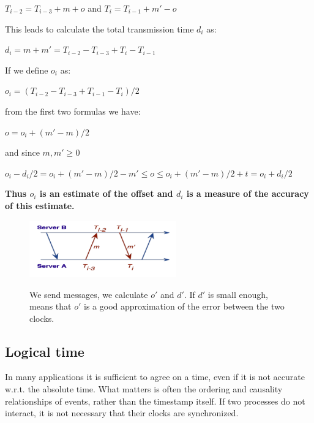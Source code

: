 \documentclass[10pt,a4paper]{article}
\begin{document}
\begin{description}
	\item $T_{i-2}=T_{i-3}+m+o$ and $T_i=T_{i-1}+m'-o$
\end{description}
This leads to calculate the total transmission time $d_i$ as:
\begin{description}
	\item $d_i=m+m'=T_{i-2}-T_{i-3}+T_{i}-T_{i-1}$
\end{description}
If we define $o_i$ as:
\begin{description}
	\item $o_i=(T_{i-2}-T_{i-3}+T_{i-1}-T_{i})/2$
\end{description}
from the first two formulas we have: 
\begin{description}
	\item $o=o_i+(m'-m)/2$
\end{description}
and since $m,m' \geq 0$
\begin{description}
	\item $o_i-d_i/2=o_i+(m'-m)/2-m' \leq o \leq o_i+(m'-m)/2+t=o_i+d_i/2$
\end{description}
\textbf{Thus $o_i$ is an estimate of the offset and $d_i$ is a measure of the accuracy of this estimate.}
\begin{figure}[h!]
 \hfill \includegraphics[width=180pt]{images/ntp-symmetric.png}\hspace*{\fill}
  \label{fig:ntp-symm}
  \caption{We send messages, we calculate $o'$ and $d'$. If $d'$ is small enough, means that $o'$ is a good approximation of the error between the two clocks.}
\end{figure}
\subsection{Logical time}
In many applications it is sufficient to agree on a time, even if it is not accurate w.r.t. the absolute time. What matters is often the ordering and causality relationships of events, rather than the timestamp itself. If two processes do not interact, it is not necessary that their clocks are synchronized.
\end{document}
